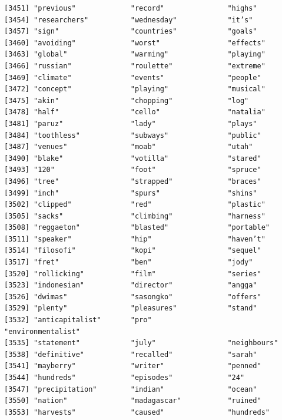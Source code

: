 \documentclass[
  letterpaper,
  DIV=11,
  numbers=noendperiod]{scrartcl}
\begin{document}
\begin{verbatim}
[3451] "previous"             "record"               "highs"               
[3454] "researchers"          "wednesday"            "it’s"                
[3457] "sign"                 "countries"            "goals"               
[3460] "avoiding"             "worst"                "effects"             
[3463] "global"               "warming"              "playing"             
[3466] "russian"              "roulette"             "extreme"             
[3469] "climate"              "events"               "people"              
[3472] "concept"              "playing"              "musical"             
[3475] "akin"                 "chopping"             "log"                 
[3478] "half"                 "cello"                "natalia"             
[3481] "paruz"                "lady"                 "plays"               
[3484] "toothless"            "subways"              "public"              
[3487] "venues"               "moab"                 "utah"                
[3490] "blake"                "votilla"              "stared"              
[3493] "120"                  "foot"                 "spruce"              
[3496] "tree"                 "strapped"             "braces"              
[3499] "inch"                 "spurs"                "shins"               
[3502] "clipped"              "red"                  "plastic"             
[3505] "sacks"                "climbing"             "harness"             
[3508] "reggaeton"            "blasted"              "portable"            
[3511] "speaker"              "hip"                  "haven’t"             
[3514] "filosofi"             "kopi"                 "sequel"              
[3517] "fret"                 "ben"                  "jody"                
[3520] "rollicking"           "film"                 "series"              
[3523] "indonesian"           "director"             "angga"               
[3526] "dwimas"               "sasongko"             "offers"              
[3529] "plenty"               "pleasures"            "stand"               
[3532] "anticapitalist"       "pro"                  "environmentalist"    
[3535] "statement"            "july"                 "neighbours"          
[3538] "definitive"           "recalled"             "sarah"               
[3541] "mayberry"             "writer"               "penned"              
[3544] "hundreds"             "episodes"             "24"                  
[3547] "precipitation"        "indian"               "ocean"               
[3550] "nation"               "madagascar"           "ruined"              
[3553] "harvests"             "caused"               "hundreds"            

\end{verbatim}
\end{document}
